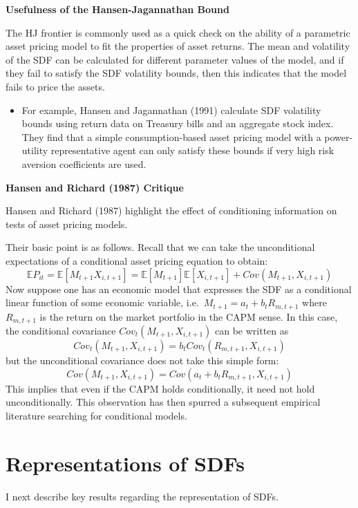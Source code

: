 \documentclass[
]{book}
\providecommand{\tightlist}{%
  \setlength{\itemsep}{0pt}\setlength{\parskip}{0pt}}
\begin{document}
\textbf{Usefulness of the Hansen-Jagannathan Bound}

The HJ frontier is commonly used as a quick check on the ability of a parametric asset pricing model to fit the properties of asset returns. The mean and volatility of the SDF can be calculated for different parameter values of the model, and if they fail to satisfy the SDF volatility bounds, then this indicates that the model fails to price the assets.

\begin{itemize}
\tightlist
\item
  For example, Hansen and Jagannathan (1991) calculate SDF volatility bounds using return data on Treasury bills and an aggregate stock index. They find that a simple consumption-based asset pricing model with a power-utility representative agent can only satisfy these bounds if very high risk aversion coefficients are used.
\end{itemize}

\textbf{Hansen and Richard (1987) Critique}

Hansen and Richard (1987) highlight the effect of conditioning information on tests of asset pricing models.

Their basic point is as follows. Recall that we can take the unconditional expectations of a conditional asset pricing equation to obtain:
\[
\mathbb{E}P_{it} = \mathbb{E}[M_{t+1} X_{i,t+1}] = \mathbb{E}[M_{t+1}]\mathbb{E}[X_{i,t+1}] + Cov(M_{t+1}, X_{i,t+1})
\]
Now suppose one has an economic model that expresses the SDF as a conditional linear function of some economic variable, i.e.~\(M_{t+1} = a_t + b_t R_{m,t+1}\) where \(R_{m,t+1}\) is the return on the market portfolio in the CAPM sense. In this case, the conditional covariance \(Cov_t(M_{t+1}, X_{i,t+1})\) can be written as
\[
Cov_t(M_{t+1}, X_{i,t+1}) = b_t Cov_t(R_{m,t+1}, X_{i,t+1})
\]
but the unconditional covariance does not take this simple form:
\[
Cov(M_{t+1}, X_{i,t+1}) = Cov(a_t + b_t R_{m,t+1}, X_{i,t+1})
\]
This implies that even if the CAPM holds conditionally, it need not hold unconditionally. This observation has then spurred a subsequent empirical literature searching for conditional models.

\hypertarget{representations-of-sdfs}{%
\section{Representations of SDFs}\label{representations-of-sdfs}}

I next describe key results regarding the representation of SDFs.
\end{document}
